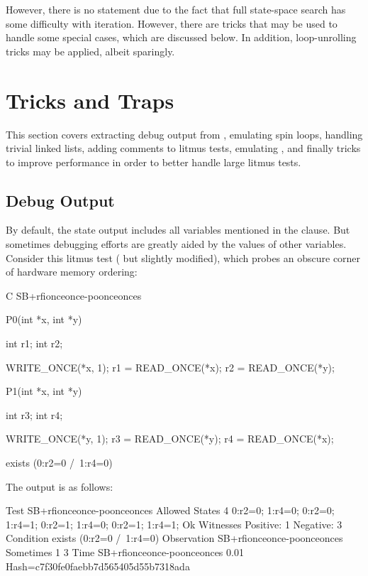However, there is no  statement due to the fact that full
state-space search has some difficulty with iteration.
However, there are tricks that may be used to handle some special cases,
which are discussed below.
In addition, loop-unrolling tricks may be applied, albeit sparingly.


\section{Tricks and Traps}

This section covers extracting debug output from , emulating
spin loops, handling trivial linked lists, adding comments to litmus tests,
emulating , and finally tricks to improve  performance
in order to better handle large litmus tests.


\subsection{Debug Output}

By default, the  state output includes all variables mentioned
in the  clause.
But sometimes debugging efforts are greatly aided by the values of other
variables.
Consider this litmus test
(
but
slightly modified), which probes an obscure corner of hardware memory ordering:

\begin{VerbatimN}[commandchars=\%\@\$]
	C SB+rfionceonce-poonceonces

	{}

	P0(int *x, int *y)
	{
		int r1;
		int r2;

		WRITE_ONCE(*x, 1);
		r1 = READ_ONCE(*x);
		r2 = READ_ONCE(*y);
	}

	P1(int *x, int *y)
	{
		int r3;
		int r4;

		WRITE_ONCE(*y, 1);
		r3 = READ_ONCE(*y);
		r4 = READ_ONCE(*x);
	}

	exists (0:r2=0 /\ 1:r4=0)
\end{VerbatimN}

The  output is as follows:

\begin{VerbatimN}
	Test SB+rfionceonce-poonceonces Allowed
	States 4
	0:r2=0; 1:r4=0;
	0:r2=0; 1:r4=1;
	0:r2=1; 1:r4=0;
	0:r2=1; 1:r4=1;
	Ok
	Witnesses
	Positive: 1 Negative: 3
	Condition exists (0:r2=0 /\ 1:r4=0)
	Observation SB+rfionceonce-poonceonces Sometimes 1 3
	Time SB+rfionceonce-poonceonces 0.01
	Hash=c7f30fe0faebb7d565405d55b7318ada
\end{VerbatimN}

